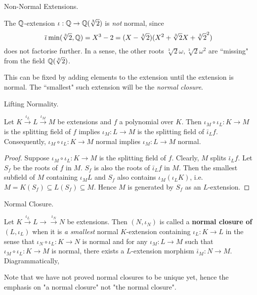 \documentclass[../book.tex]{subfiles}
\begin{document}
\begin{eg} Non-Normal Extensions. 
    
    The $\mathbb{Q}$-extension $\iota : \mathbb{Q} \to \mathbb{Q}(\sqrt[3]{2})$ is \emph{not} normal, 
    since \[
        \overline{\iota}\min(\sqrt[3]{2},\mathbb{Q}) = X^3 - 2 
        = (X - \sqrt[3]{2})(X^2 + \sqrt[3]{2}X + \sqrt[3]{2}^2)
    \]
    does not factorise further. 
    In a sense, the other roots $\sqrt[3]{2}\omega, \sqrt[3]{2}\omega^2$ 
    are ``missing" from the field $\mathbb{Q}(\sqrt[3]{2})$. 
    
    This can be fixed by adding elements to the extension until 
    the extension is normal.
    The ``smallest" such extension will be the \emph{normal closure}.
\end{eg}
\begin{lem} Lifting Normality. 

    Let $K \overset{\iota_L}{\to} L \overset{\iota_M}{\to} M$ be extensions
    and $f$ a polynomial over $K$. 
    Then $\iota_M\circ\iota_L : K \to M$ is the splitting field of $f$
    implies $\iota_M : L \to M$ is the splitting field of $\bar\iota_L f$. 
    Consequently, $\iota_M\circ\iota_L : K \to M$ normal 
    implies $\iota_M : L \to M$ normal. 
    
\end{lem}
\begin{proof}
    Suppose $\iota_M\circ\iota_L : K \to M$ is the splitting field of $f$. 
    Clearly, $M$ splits $\bar\iota_L f$. 
    Let $S_f$ be the roots of $f$ in $M$. 
    $S_f$ is also the roots of $\bar\iota_L f$ in $M$. 
    Then the smallest subfield of $M$ containing $\iota_M L$ and $S_f$ 
    also contains $\iota_M(\iota_L K)$, 
    i.e. $M = K(S_f) \subseteq L(S_f) \subseteq M$.
    Hence $M$ is generated by $S_f$ as an $L$-extension. 
\end{proof}
\begin{dfn} Normal Closure. 
    
    Let $K \overset{\iota_L}{\to} L \to \overset{\iota_N}{\to} N$ be extensions. 
    Then $(N,\iota_N)$ is called 
    a \textbf{normal closure of $(L,\iota_L)$} when
    it is \emph{a smallest} normal $K$-extension containing $\iota_L : K \to L$
    in the sense that $\iota_N\circ\iota_L : K \to N$ is normal and 
    for any $\iota_M : L \to M$ such that $\iota_M\circ\iota_L : K \to M$ is normal,
    there exists a $L$-extension morphism $\bar\iota_M : N \to M$.
    Diagrammatically, 
    \begin{figure} [H]
        \centering
    \end{figure}
    
    Note that we have not proved normal closures to be unique yet,
    hence the emphasis on "a normal closure" not "the normal closure". 
\end{dfn}
\end{document}
